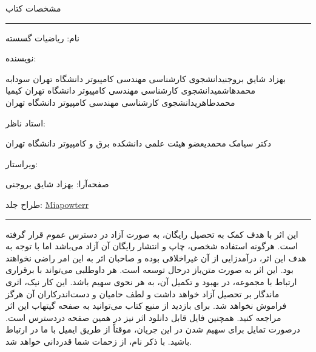 \newpage
\thispagestyle{empty}
\begin{center}
    مشخصات کتاب
\end{center}

\rule{\textwidth}{0.5pt}

\scriptsize{

نام: ریاضیات گسسته

نویسنده:
\begin{AFFILIATIONS}
    \AFFILIATIONROW
    {بهزاد شایق بروجنی}{دانشجوی کارشناسی مهندسی کامپیوتر دانشگاه تهران}{}
    {سودابه محمدهاشمی}{دانشجوی کارشناسی مهندسی کامپیوتر دانشگاه تهران}{}
    {کیمیا محمدطاهری}{دانشجوی کارشناسی مهندسی کامپیوتر دانشگاه تهران}{}
\end{AFFILIATIONS}

استاد ناظر:
\begin{AFFILIATIONS}
    \AFFILIATIONROW
    {دکتر سیامک محمدی}{عضو هیئت علمی دانشکده برق و کامپیوتر دانشگاه تهران}{}
    {}{}{}
    {}{}{}
\end{AFFILIATIONS}

ویراستار:

صفحه‌آرا:
بهزاد شایق بروجنی

طراح جلد:
\href{https://pixabay.com/users/miapowterr-1721989}{Miapowterr}

}

\rule{\textwidth}{0.5pt}

\scriptsize{
\p
این اثر با هدف کمک به تحصیل رایگان، به صورت آزاد در دسترس عموم قرار گرفته است.
هرگونه استفاده شخصی، چاپ و انتشار رایگان آن آزاد می‌باشد اما
با توجه به هدف این اثر، درآمدزایی از آن غیراخلاقی بوده و صاحبان اثر
به این امر راضی نخواهند بود.
\p
این اثر به صورت متن‌باز درحال توسعه است. هر داوطلبی می‌تواند
با برقراری ارتباط با مجموعه، در بهبود و تکمیل آن، به هر نحوی سهیم باشد.
این کار نیک، اثری ماندگار بر تحصیل آزاد خواهد داشت و لطف
حامیان و دست‌اندرکاران آن هرگز فراموش نخواهد شد.
\p
برای بازدید از منبع کتاب می‌توانید به صفحه
گیتهاب
این اثر مراجعه کنید.
همچنین فایل قابل دانلود اثر نیز در
همین صفحه
دردسترس است.
درصورت تمایل برای سهیم شدن در این جریان،
موقتاً از طریق
ایمیل
با ما در ارتباط باشید.
با ذکر نام، از زحمات شما قدردانی خواهد شد.
}
